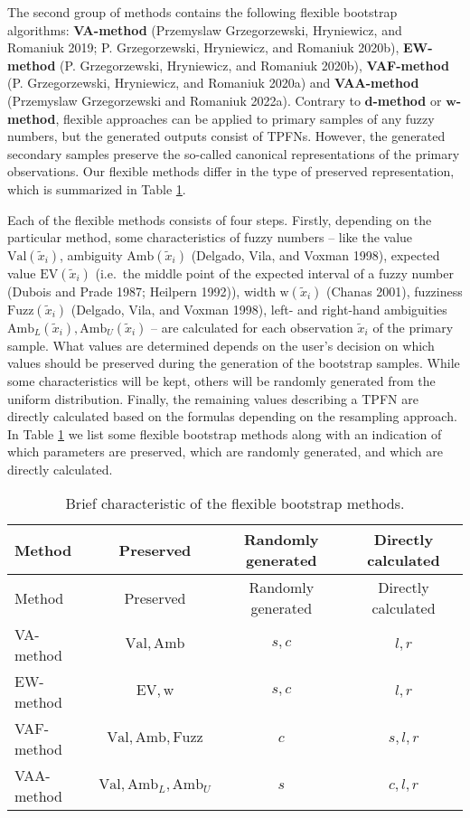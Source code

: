 The second group of methods contains the following flexible bootstrap
algorithms: \textbf{VA-method} (Przemyslaw Grzegorzewski, Hryniewicz, and Romaniuk 2019; P. Grzegorzewski, Hryniewicz, and Romaniuk 2020b),
\textbf{EW-method} (P. Grzegorzewski, Hryniewicz, and Romaniuk 2020b), \textbf{VAF-method}
(P. Grzegorzewski, Hryniewicz, and Romaniuk 2020a) and \textbf{VAA-method} (Przemyslaw Grzegorzewski and Romaniuk 2022a).
Contrary to \(\mathbf{d}\)\textbf{-method} or \(\mathbf{w}\)\textbf{-method}, flexible
approaches can be applied to primary samples of any fuzzy numbers, but
the generated outputs consist of TPFNs. However, the generated secondary
samples preserve the so-called canonical representations of the primary
observations. Our flexible methods differ in the type of preserved
representation, which is summarized in Table
\protect\hyperlink{tab101}{1}.

Each of the flexible methods consists of four steps. Firstly, depending
on the particular method, some characteristics of fuzzy numbers -- like
the value \(\mathrm{Val}(\tilde{x}_i)\), ambiguity
\(\mathrm{Amb}(\tilde{x}_i)\) (Delgado, Vila, and Voxman 1998), expected value
\(\mathrm{EV}(\tilde{x}_i)\) (i.e.~the middle point of the expected
interval of a fuzzy number (Dubois and Prade 1987; Heilpern 1992)), width
\(\mathrm{w}(\tilde{x}_i)\) (Chanas 2001), fuzziness
\(\mathrm{Fuzz} (\tilde{x}_i)\) (Delgado, Vila, and Voxman 1998), left- and right-hand
ambiguities \(\mathrm{Amb}_L (\tilde{x}_i), \mathrm{Amb}_U (\tilde{x}_i)\)
-- are calculated for each observation \(\tilde{x}_i\) of the primary
sample. What values are determined depends on the user's decision on
which values should be preserved during the generation of the bootstrap
samples. While some characteristics will be kept, others will be
randomly generated from the uniform distribution. Finally, the remaining
values describing a TPFN are directly calculated based on the formulas
depending on the resampling approach. In Table
\protect\hyperlink{tab101}{1} we list some
flexible bootstrap methods along with an indication of which parameters
are preserved, which are randomly generated, and which are directly
calculated.

\hypertarget{tab101}{}
\begin{longtable}[]{@{}lccc@{}}
\caption{Brief characteristic of the flexible bootstrap methods.}\tabularnewline
\toprule\noalign{}
Method & Preserved & Randomly generated & Directly calculated \\
\midrule\noalign{}
\endfirsthead
\toprule\noalign{}
Method & Preserved & Randomly generated & Directly calculated \\
\midrule\noalign{}
\endhead
\bottomrule\noalign{}
\endlastfoot
VA-method & \(\mathrm{Val},\mathrm{Amb}\) & \(s,c\) & \(l,r\) \\
EW-method & \(\mathrm{EV},\mathrm{w}\) & \(s,c\) & \(l,r\) \\
VAF-method & \(\mathrm{Val},\mathrm{Amb},\mathrm{Fuzz}\) & \(c\) & \(s,l,r\) \\
VAA-method & \(\mathrm{Val},\mathrm{Amb}_L,\mathrm{Amb}_U\) & \(s\) & \(c,l,r\) \\
\end{longtable}

